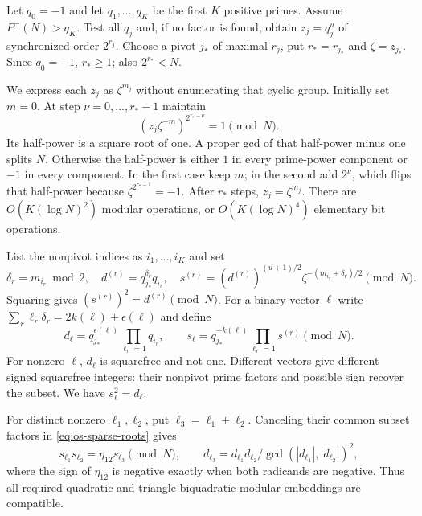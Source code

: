 Let $q_0=-1$ and let $q_1,\ldots,q_K$ be the first $K$ positive primes.
Assume $P^-(N)>q_K$.  Test all $q_j$ and, if no factor is found, obtain
$z_j=q_j^u$ of synchronized order $2^{r_j}$.
Choose a pivot $j_*$ of maximal $r_j$, put
$r_*=r_{j_*}$ and $\zeta=z_{j_*}$.
Since $q_0=-1$, $r_*\geq1$; also $2^{r_*}<N$.

We express each $z_j$ as $\zeta^{m_j}$ without enumerating that cyclic
group.  Initially set $m=0$.  At step $\nu=0,\ldots,r_*-1$ maintain
\[
 (z_j\zeta^{-m})^{2^{r_*-\nu}}=1\pmod N.
\]
Its half-power is a square root of one.  A proper gcd of that half-power
minus one splits $N$.  Otherwise the half-power is either $1$ in every
prime-power component or $-1$ in every component.  In the first case
keep $m$; in the second add $2^\nu$, which flips that half-power because
$\zeta^{2^{r_*-1}}=-1$.  After $r_*$ steps, $z_j=\zeta^{m_j}$.
There are $O(K(\log N)^2)$ modular operations, or
$O(K(\log N)^4)$ elementary bit operations.

List the nonpivot indices as $i_1,\ldots,i_K$ and set
\begin{equation}
 \delta_r=m_{i_r}\bmod2,\quad
 d^{(r)}=q_{j_*}^{\delta_r}q_{i_r},\quad
 s^{(r)}=(d^{(r)})^{(u+1)/2}
                    \zeta^{-(m_{i_r}+\delta_r)/2}\pmod N.
 \label{eq:os-base-roots}
\end{equation}
Squaring gives $(s^{(r)})^2=d^{(r)}\pmod N$.
For a binary vector $\ell$ write
$\sum_r\ell_r\delta_r=2k(\ell)+\epsilon(\ell)$ and define
\begin{equation}
 d_\ell=q_{j_*}^{\epsilon(\ell)}\prod_{\ell_r=1}q_{i_r},
 \qquad
 s_\ell=q_{j_*}^{-k(\ell)}\prod_{\ell_r=1}s^{(r)}\pmod N.
 \label{eq:os-sparse-roots}
\end{equation}
For nonzero $\ell$, $d_\ell$ is squarefree and not one.  Different
vectors give different signed squarefree integers: their nonpivot prime
factors and possible sign recover the subset.  We have $s_\ell^2=d_\ell$.

For distinct nonzero $\ell_1,\ell_2$, put $\ell_3=\ell_1+\ell_2$.
Canceling their common subset factors in \eqref{eq:os-sparse-roots} gives
\begin{equation}
 s_{\ell_1}s_{\ell_2}=\eta_{12}s_{\ell_3}\pmod N,
 \qquad
 d_{\ell_3}=d_{\ell_1}d_{\ell_2}/\gcd(|d_{\ell_1}|,|d_{\ell_2}|)^2,
 \label{eq:os-compatible}
\end{equation}
where the sign of $\eta_{12}$ is negative exactly when both radicands
are negative.  Thus all required quadratic and triangle-biquadratic
modular embeddings are compatible.

